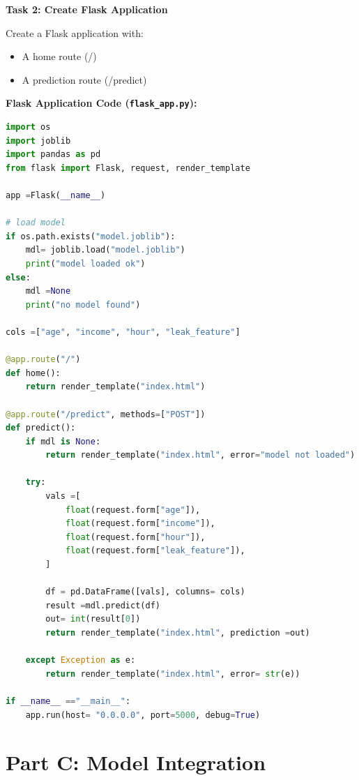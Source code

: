 \documentclass[12pt,a4paper]{article}
\begin{document}
\begin{tcolorbox}
\textbf{Task 2: Create Flask Application}

Create a Flask application with:
\begin{itemize}
\item A home route (/)
\item A prediction route (/predict)
\end{itemize}

\textbf{Flask Application Code (\texttt{flask\_app.py}):}

\begin{lstlisting}[language=Python]
import os
import joblib
import pandas as pd
from flask import Flask, request, render_template

app =Flask(__name__)

# load model
if os.path.exists("model.joblib"):
    mdl= joblib.load("model.joblib")
    print("model loaded ok")
else:
    mdl =None
    print("no model found")

cols =["age", "income", "hour", "leak_feature"]

@app.route("/")
def home():
    return render_template("index.html")

@app.route("/predict", methods=["POST"])
def predict():
    if mdl is None:
        return render_template("index.html", error="model not loaded")

    try:
        vals =[
            float(request.form["age"]),
            float(request.form["income"]),
            float(request.form["hour"]),
            float(request.form["leak_feature"]),
        ]

        df = pd.DataFrame([vals], columns= cols)
        result =mdl.predict(df)
        out= int(result[0])
        return render_template("index.html", prediction =out)

    except Exception as e:
        return render_template("index.html", error= str(e))

if __name__ =="__main__":
    app.run(host= "0.0.0.0", port=5000, debug=True)
\end{lstlisting}

\end{tcolorbox}

\vspace{24pt}


\section*{Part C: Model Integration}
\end{document}
